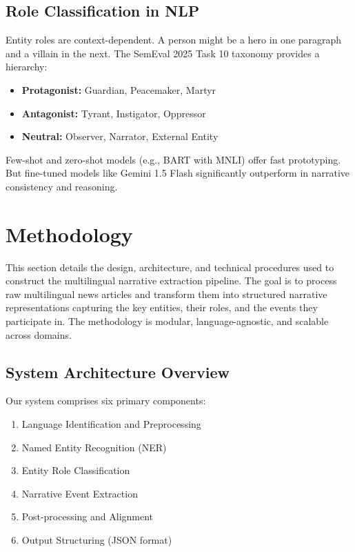\documentclass[12pt]{article}
\begin{document}
\subsection{Role Classification in NLP}

Entity roles are context-dependent. A person might be a hero in one paragraph and a villain in the next. The SemEval 2025 Task 10 taxonomy provides a hierarchy:
\begin{itemize}
    \item \textbf{Protagonist:} Guardian, Peacemaker, Martyr
    \item \textbf{Antagonist:} Tyrant, Instigator, Oppressor
    \item \textbf{Neutral:} Observer, Narrator, External Entity
\end{itemize}

Few-shot and zero-shot models (e.g., BART with MNLI) offer fast prototyping. But fine-tuned models like Gemini 1.5 Flash significantly outperform in narrative consistency and reasoning.

\section{Methodology}

This section details the design, architecture, and technical procedures used to construct the multilingual narrative extraction pipeline. The goal is to process raw multilingual news articles and transform them into structured narrative representations capturing the key entities, their roles, and the events they participate in. The methodology is modular, language-agnostic, and scalable across domains.

\subsection{System Architecture Overview}

Our system comprises six primary components:
\begin{enumerate}
    \item Language Identification and Preprocessing
    \item Named Entity Recognition (NER)
    \item Entity Role Classification
    \item Narrative Event Extraction
    \item Post-processing and Alignment
    \item Output Structuring (JSON format)
\end{enumerate}
\end{document}
